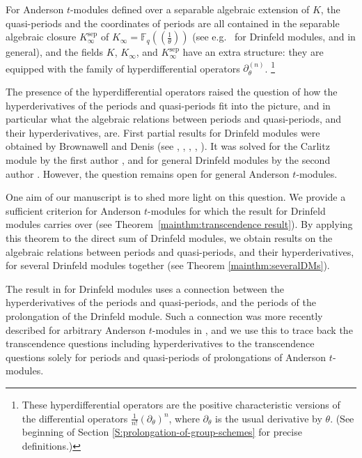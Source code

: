 \documentclass[10pt,a4paper]{amsart}
\theoremstyle{plain} %
\theoremstyle{definition}
\theoremstyle{remark}
\newcommand{\FF}{\mathbb{F}}
\newcommand{\Fq}{\FF_{\!q}}  %
\newcommand{\ls}[1]{(\!(#1)\!)}%
\newcommand{\sep}{\mathrm{sep}}
\newcommand{\hdthe}[1]{\partial_{\theta}^{(#1)}}  %
\numberwithin{equation}{subsection}
\begin{document}
\medskip

For Anderson $t$-modules defined over a separable algebraic extension of $K$, the quasi-periods and the coordinates of periods are all contained in the separable algebraic closure $K_\infty^\sep$ of $K_\infty=\Fq\ls{\tfrac{1}{\theta}}$ (see e.g.~\cite[p.6, Remarque]{ld:dmdt} for Drinfeld modules, and \cite[Lemma 4.22]{cn-mp:hpqpam} in general), and the fields $K$, $K_\infty$, and $K_\infty^\sep$ have an extra structure: they are equipped with the family of hyperdifferential operators $\hdthe{n}$. \footnote{These hyperdifferential operators are the positive characteristic versions of the  differential operators $\frac{1}{n!}(\partial_\theta)^n$, where $\partial_\theta$ is the usual derivative by $\theta$. (See beginning of Section \ref{S:prolongation-of-group-schemes} for precise definitions.)}

The presence of the hyperdifferential operators 
raised the question of how the hyperderivatives of the periods and quasi-periods fit into the picture, and in particular what the algebraic relations between periods and quasi-periods, and their hyperderivatives, are. 
First partial results for Drinfeld modules were obtained by Brownawell and Denis (see \cite{ld:dmdt}, \cite{ld:iac2}, \cite{db:lidddm-I}, \cite{ld:iadpmc}, \cite{db-ld:lidddm-II}). It was solved for the Carlitz module by the first author \cite{am:aicph}, and for general Drinfeld modules by the second author \cite{cn:arhpldm}. 
However, the question remains open for general Anderson $t$-modules.

\medskip

One aim of our manuscript is to shed more light on this question. We provide a sufficient criterion for Anderson $t$-modules for which the result for Drinfeld modules carries over (see Theorem~\ref{mainthm:transcendence result}).
By applying this theorem to the direct sum of Drinfeld modules, we obtain results on the algebraic relations between periods and quasi-periods, and their hyperderivatives, for several Drinfeld modules together (see Theorem \ref{mainthm:severalDMs}).

The result in \cite{cn:arhpldm} for Drinfeld modules uses a connection between the hyperderivatives of the periods and quasi-periods, and the periods of the prolongation of the Drinfeld module. Such a connection was more recently described for arbitrary Anderson $t$-modules in \cite{cn-mp:hpqpam}, and we use this to trace back the transcendence questions including hyperderivatives to the transcendence questions solely for periods and quasi-periods of prolongations of Anderson $t$-modules.
\end{document}

